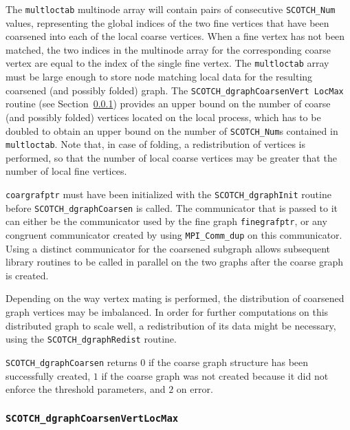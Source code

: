 \begin{itemize}
The \texttt{multloctab} multinode array will contain pairs of
consecutive \texttt{SCOTCH\_\lbt Num} values, representing the global
indices of the two fine vertices that have been coarsened into each of
the local coarse vertices. When a fine vertex has not been matched,
the two indices in the multinode array for the corresponding coarse
vertex are equal to the index of the single fine vertex.
The \texttt{multloctab} array must be large enough to store node
matching local data for the resulting coarsened (and possibly folded)
graph. The \texttt{SCOTCH\_\lbt dgraph\lbt Coarsen\lbt Vert\lbt
Loc\lbt Max} routine (see
Section~\ref{sec-lib-func-scotchdgraphcoarsenvertlocmax}) provides an
upper bound on the number of coarse (and possibly folded) vertices
located on the local process, which has to be doubled to obtain an
upper bound on the number of \texttt{SCOTCH\_\lbt Num}s contained in
\texttt{multloctab}. Note that, in case of folding, a redistribution
of vertices is performed, so that the number of local coarse vertices
may be greater that the number of local fine vertices.

{\tt coargrafptr} must have been initialized with the
{\tt SCOTCH\_\lbt dgraph\lbt Init} routine before
{\tt SCOTCH\_dgraph\lbt Coarsen} is called. The communicator that is
passed to it can either be the communicator used by the fine graph
{\tt fine\lbt graf\lbt ptr}, or any congruent communicator created by
using {\tt MPI\_\lbt Comm\_\lbt dup} on this communicator. Using a
distinct communicator for the coarsened subgraph allows subsequent
library routines to be called in parallel on the two graphs after the
coarse graph is created.

Depending on the way vertex mating is performed, the distribution of
coarsened graph vertices may be imbalanced. In order for further
computations on this distributed graph to scale well, a redistribution
of its data might be necessary, using the
{\tt SCOTCH\_dgraph\lbt Redist} routine.

\progret

{\tt SCOTCH\_dgraphCoarsen} returns $0$ if the coarse graph
structure has been successfully created, $1$ if the coarse graph was
not created because it did not enforce the threshold parameters, and
$2$ on error.
\end{itemize}

\subsubsection{{\tt SCOTCH\_dgraphCoarsenVertLocMax}}
\label{sec-lib-func-scotchdgraphcoarsenvertlocmax}

